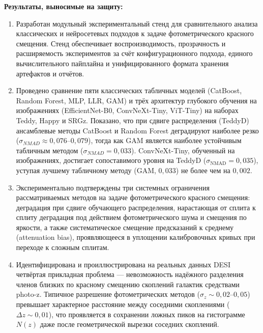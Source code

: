 \documentclass[12pt,a4paper]{article}
\begin{document}
\bigskip
\noindent\textbf{Результаты, выносимые на защиту:}
\begin{enumerate}
    \item Разработан модульный экспериментальный стенд для сравнительного анализа классических и нейросетевых подходов к задаче фотометрического красного смещения. Стенд обеспечивает воспроизводимость, прозрачность и расширяемость экспериментов за счёт конфигурационного подхода, единого вычислительного пайплайна и унифицированного формата хранения артефактов и отчётов.
    \item Проведено сравнение пяти классических табличных моделей (CatBoost, Random Forest, MLP, LLR, GAM) и трёх архитектур глубокого обучения на изображениях (EfficientNet-B0, ConvNeXt-Tiny, ViT-Tiny) на наборах Teddy, Happy и SRGz. Показано, что при сдвиге распределения (TeddyD) ансамблевые методы CatBoost и Random Forest деградируют наиболее резко ($\sigma_{NMAD} \approx 0{,}076$–$0{,}079$), тогда как GAM является наиболее устойчивым табличным методом ($\sigma_{NMAD} = 0{,}033$). ConvNeXt-Tiny, обученный на изображениях, достигает сопоставимого уровня на TeddyD ($\sigma_{\mathrm{NMAD}} = 0{,}035$), уступая лучшему табличному методу (GAM, $0{,}033$) не более чем на $0{,}002$.
    \item Экспериментально подтверждены три системных ограничения рассматриваемых методов на задаче фотометрического красного смещения: деградация при сдвиге обучающего распределения, нарастающая от сплита к сплиту деградация под действием фотометрического шума и смещения по яркости, а также систематическое смещение предсказаний к среднему (attenuation bias), проявляющееся в уплощении калибровочных кривых при переходе к сложным сплитам.
    \item Идентифицирована и проиллюстрирована на реальных данных DESI четвёртая прикладная проблема — невозможность надёжного разделения членов близких по красному смещению скоплений галактик средствами photo-z. Типичное разрешение фотометрических методов ($\sigma_z \sim 0{,}02$–$0{,}05$) превышает характерное расстояние между соседними скоплениями ($\Delta z \sim 0{,}01$), что проявляется в сохранении ложных пиков на гистограмме $N(z)$ даже после геометрической вырезки соседних скоплений.
\end{enumerate}
\end{document}
